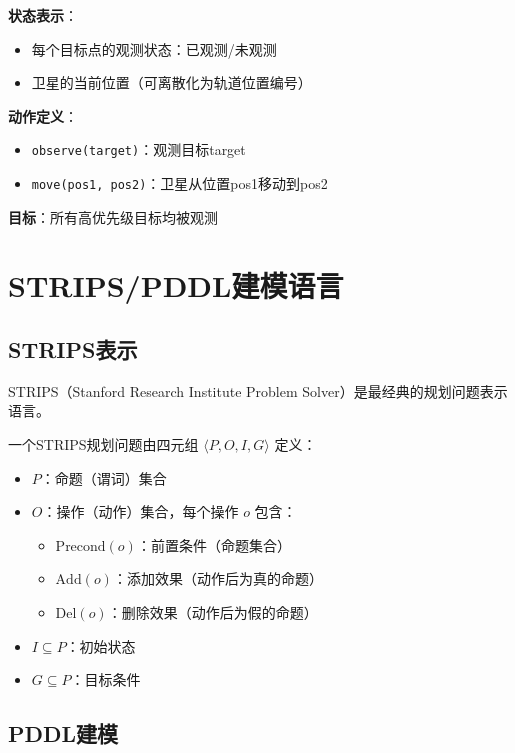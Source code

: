 \textbf{状态表示}：
\begin{itemize}[leftmargin=2em]
  \item 每个目标点的观测状态：已观测/未观测
  \item 卫星的当前位置（可离散化为轨道位置编号）
\end{itemize}

\textbf{动作定义}：
\begin{itemize}[leftmargin=2em]
  \item \texttt{observe(target)}：观测目标target
  \item \texttt{move(pos1, pos2)}：卫星从位置pos1移动到pos2
\end{itemize}

\textbf{目标}：所有高优先级目标均被观测

\section{STRIPS/PDDL建模语言}

\subsection{STRIPS表示}

STRIPS（Stanford Research Institute Problem Solver）是最经典的规划问题表示语言。

\begin{definition}[STRIPS规划问题]
一个STRIPS规划问题由四元组 $\langle P, O, I, G \rangle$ 定义：
\begin{itemize}
  \item $P$：命题（谓词）集合
  \item $O$：操作（动作）集合，每个操作 $o$ 包含：
    \begin{itemize}
      \item $\text{Precond}(o)$：前置条件（命题集合）
      \item $\text{Add}(o)$：添加效果（动作后为真的命题）
      \item $\text{Del}(o)$：删除效果（动作后为假的命题）
    \end{itemize}
  \item $I \subseteq P$：初始状态
  \item $G \subseteq P$：目标条件
\end{itemize}
\end{definition}

\subsection{PDDL建模}

